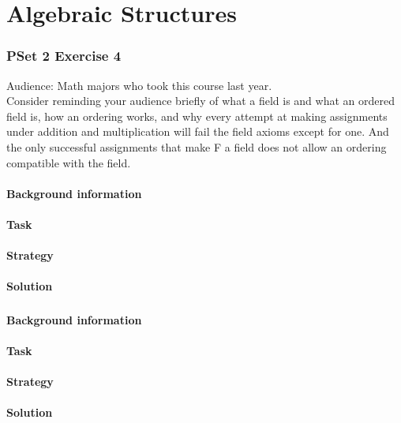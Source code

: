 \documentclass[11 pt]{article}
\begin{document}
\part{Algebraic Structures}
\section{PSet 2 Exercise 4}
Audience: Math majors who took this course last year.\\
Consider reminding your audience briefly of what a field is and what an ordered field is,
how an ordering works, and why every attempt at making assignments under addition and
multiplication will fail the field axioms except for one. And the only successful assignments that make F a
field does not allow an ordering compatible with the field.
\begin{multicols*}{2} 
\subsection{Background information}
\subsection{Task}
\subsection{Strategy}
\columnbreak
\subsection{Solution}
\end{multicols*}
\pagebreak
\section{}
\begin{multicols*}{2} 
\subsection{Background information}
\subsection{Task}
\subsection{Strategy}
\columnbreak
\subsection{Solution}
\end{multicols*}
\pagebreak
\end{document}
